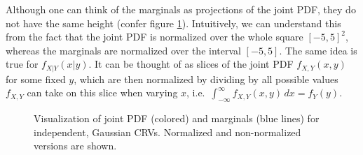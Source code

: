 Although one can think of the marginals as projections of the joint PDF, they do not have the same height (confer figure \ref{fig:joint_marginal_PDF}). Intuitively, we can understand this from the fact that the joint PDF is normalized over the whole square $[-5, 5]^2$, whereas the marginals are normalized over the interval $[-5, 5]$. The same idea is true for $f_{X | Y}(x | y)$. It can be thought of as slices of the joint PDF $f_{X, Y}(x, y)$ for some fixed $y$, which are then normalized by dividing by all possible values $f_{X, Y}$ can take on this slice when varying $x$, i.e.~$\int_{- \infty}^\infty f_{X, Y}(x, y) \, dx = f_Y(y)$.



\begin{figure}
\centering


%
\hspace{0.04\textwidth}%
%


\caption{Visualization of joint PDF (colored) and marginals (blue lines) for independent, Gaussian CRVs. Normalized and non-normalized versions are shown.}
\label{fig:joint_marginal_PDF}
\end{figure}



